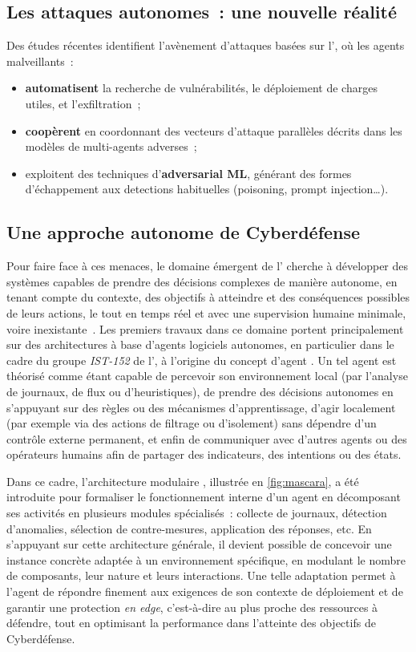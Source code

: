 \subsection*{Les attaques autonomes~: une nouvelle réalité}

Des études récentes identifient l'avènement d'attaques basées sur l', où les agents malveillants~:
\begin{itemize}
    \item \textbf{automatisent} la recherche de vulnérabilités, le déploiement de charges utiles, et l'exfiltration~\cite{AutoAttacker2024};
    \item \textbf{coopèrent} en coordonnant des vecteurs d'attaque parallèles décrits dans les modèles de multi-agents adverses~\cite{Falong2025};
    \item exploitent des techniques d'\textbf{adversarial ML}, générant des formes d'échappement aux detections habituelles (poisoning, prompt injection…).
\end{itemize}

\subsection*{Une approche autonome de Cyberdéfense}

Pour faire face à ces menaces, le domaine émergent de l' cherche à développer des systèmes capables de prendre des décisions complexes de manière autonome, en tenant compte du contexte, des objectifs à atteindre et des conséquences possibles de leurs actions, le tout en temps réel et avec une supervision humaine minimale, voire inexistante~\cite{Vyas2023}. Les premiers travaux dans ce domaine portent principalement sur des architectures à base d'agents logiciels autonomes, en particulier dans le cadre du groupe \textit{IST-152} de l', à l'origine du concept d'agent .
Un tel agent est théorisé comme étant capable de percevoir son environnement local (par l'analyse de journaux, de flux ou d'heuristiques), de prendre des décisions autonomes en s'appuyant sur des règles ou des mécanismes d'apprentissage, d'agir localement (par exemple via des actions de filtrage ou d'isolement) sans dépendre d'un contrôle externe permanent, et enfin de communiquer avec d'autres agents ou des opérateurs humains afin de partager des indicateurs, des intentions ou des états.

Dans ce cadre, l'architecture modulaire , illustrée en \autoref{fig:mascara}, a été introduite pour formaliser le fonctionnement interne d'un agent  en décomposant ses activités en plusieurs modules spécialisés~: collecte de journaux, détection d'anomalies, sélection de contre-mesures, application des réponses, etc. En s'appuyant sur cette architecture générale, il devient possible de concevoir une instance concrète adaptée à un environnement spécifique, en modulant le nombre de composants, leur nature et leurs interactions. Une telle adaptation permet à l'agent  de répondre finement aux exigences de son contexte de déploiement et de garantir une protection {\em en edge}, c'est-à-dire au plus proche des ressources à défendre, tout en optimisant la performance dans l'atteinte des objectifs de Cyberdéfense.

